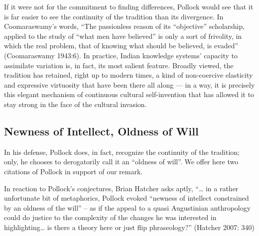 If it were not for the commitment to finding differences, Pollock would see that it is far easier to see the continuity of the tradition than its divergence. In Coomaraswamy’s words, “The passionless reason of its “objective” scholarship, applied to the study of “what men have believed” is only a sort of frivolity, in which the real problem, that of knowing what should be believed, is evaded” (Coomaraswamy 1943:6). In practice, Indian knowledge systems’ capacity to assimilate variation is, in fact, its most salient feature. Broadly viewed, the tradition has retained, right up to modern times, a kind of non-coercive elasticity and expressive virtuosity that have been there all along — in a way, it is precisely this elegant mechanism of continuous cultural self-invention that has allowed it to stay strong in the face of the cultural invasion.\\[-20pt] 


\subsection{Newness of Intellect, Oldness of Will}%

In his defense, Pollock does, in fact, recognize the continuity of the tradition; only, he chooses to derogatorily call it an “oldness of will”. We offer here two citations of Pollock in support of our remark.
In reaction to Pollock’s conjectures, Brian Hatcher asks aptly, “… in a rather unfortunate bit of metaphorics, Pollock evoked “newness of intellect constrained by an oldness of the will” – as if the appeal to a quasi Augustinian anthropology could do justice to the complexity of the changes he was interested in highlighting… is there a theory here or just flip phraseology?” (Hatcher 2007: 340) 

